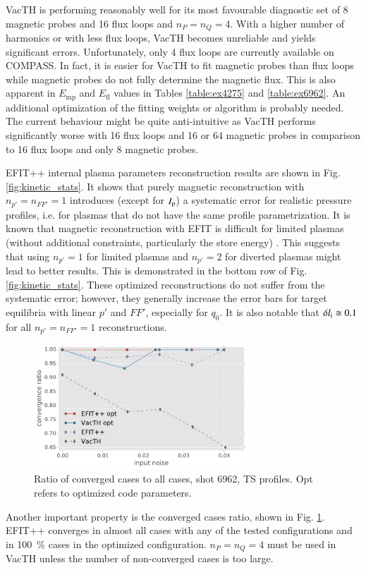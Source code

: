 VacTH is performing reasonably well for its most favourable diagnostic set of 8 magnetic probes and 16 flux loops and $n_P = n_Q = 4$. With a higher number of harmonics or with less flux loops, VacTH becomes unreliable and yields significant errors. Unfortunately, only 4 flux loops are currently available on COMPASS. In fact, it is easier for VacTH to fit magnetic probes than flux loops while magnetic probes do not fully determine the magnetic flux. This is also apparent in $E_\mathrm{mp}$ and $E_\mathrm{fl}$ values in Tables \ref{table:ex4275} and \ref{table:ex6962}. An additional optimization of the fitting weights or algorithm is probably needed. The current behaviour might be quite anti-intuitive as VacTH performs significantly worse with 16 flux loops and 16 or 64 magnetic probes in comparison to 16 flux loops and only 8 magnetic probes. 

EFIT++ internal plasma parameters reconstruction results are shown in Fig. \ref{fig:kinetic_stats}. It shows that purely magnetic reconstruction with $n_{p'}=n_{FF'}=1$ introduces (except for $I_{\rm{p}}$) a systematic error for realistic pressure profiles, i.e. for plasmas that do not have the same profile parametrization. 
It is known that magnetic reconstruction with EFIT is difficult for limited plasmas (without additional constraints, particularly the store energy) \cite{efit1985}.
This suggests that using $n_{p'}=1$ for limited plasmas and $n_{p'}=2$ for diverted plasmas might lead to better results. This is demonstrated in the bottom row of Fig. \ref{fig:kinetic_stats}.
These optimized reconstructions do not suffer from the systematic error; however, they generally increase the error bars for target equilibria with linear $p'$ and $FF'$, especially for $q_0$. It is also notable that $\delta l_{\rm{i}} \cong 0.1$ for all $n_{p'}=n_{FF'}=1$ reconstructions.

\begin{figure}
\centering   %
\hfill{}
\includegraphics[width=8cm]{figures/convergence_ratio_6962.pdf}
\hfill{}
\caption{Ratio of converged cases to all cases, shot 6962, TS profiles. Opt refers to optimized code parameters.}
\label{fig:convergence_ratio}
\end{figure}

Another important property is the converged cases ratio, shown in Fig. \ref{fig:convergence_ratio}. EFIT++ converges in almost all cases with any of the tested configurations and in 100~\% cases in the optimized configuration. $n_P = n_Q = 4$ must be used in VacTH unless the number of non-converged cases is too large.



